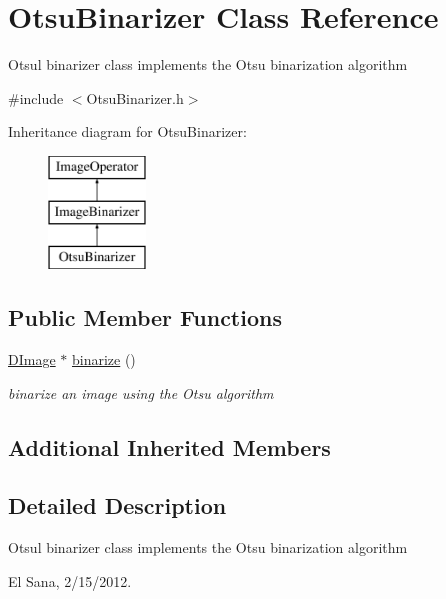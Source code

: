 \hypertarget{class_otsu_binarizer}{\section{Otsu\+Binarizer Class Reference}
\label{class_otsu_binarizer}
}


Otsul binarizer class implements the Otsu binarization algorithm  




{\ttfamily \#include $<$Otsu\+Binarizer.\+h$>$}

Inheritance diagram for Otsu\+Binarizer\+:\begin{figure}[H]
\begin{center}
\leavevmode
\includegraphics[height=3.000000cm]{class_otsu_binarizer}
\end{center}
\end{figure}
\subsection*{Public Member Functions}
\begin{DoxyCompactItemize}
\item 
\hyperlink{class_d_image}{D\+Image} $\ast$ \hyperlink{class_otsu_binarizer_a4219a9f9e72d1d0eceee30402bf2afd5}{binarize} ()
\begin{DoxyCompactList}\small\item\em binarize an image using the Otsu algorithm \end{DoxyCompactList}\end{DoxyCompactItemize}
\subsection*{Additional Inherited Members}


\subsection{Detailed Description}
Otsul binarizer class implements the Otsu binarization algorithm 

El Sana, 2/15/2012. 

